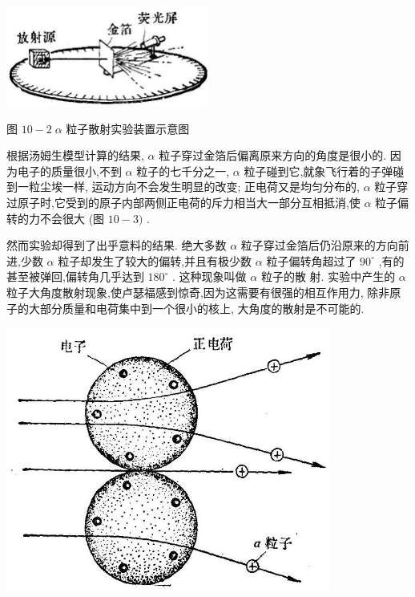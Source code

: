 \documentclass[10pt]{article}
\begin{document}
\begin{center}
\includegraphics[max width=0.5\textwidth]{images/01913056-1f15-74d8-9184-9aab52c9d66b_328_650051.jpg}
\end{center}

图 \({10} - 2\;\alpha\) 粒子散射实验装置示意图

根据汤姆生模型计算的结果, \(\alpha\) 粒子穿过金箔后偏离原来方向的角度是很小的. 因为电子的质量很小,不到 \(\alpha\) 粒子的七千分之一, \(\alpha\) 粒子碰到它,就象飞行着的子弹碰到一粒尘埃一样, 运动方向不会发生明显的改变; 正电荷又是均匀分布的, \(\alpha\) 粒子穿过原子时,它受到的原子内部两侧正电荷的斥力相当大一部分互相抵消,使 \(\alpha\) 粒子偏转的力不会很大 (图 \({10} - 3)\) .

然而实验却得到了出乎意料的结果. 绝大多数 \(\alpha\) 粒子穿过金箔后仍沿原来的方向前进,少数 \(\alpha\) 粒子却发生了较大的偏转,并且有极少数 \(\alpha\) 粒子偏转角超过了 \({90}^{ \circ }\) ,有的甚至被弹回,偏转角几乎达到 \({180}^{ \circ }\) . 这种现象叫做 \(\alpha\) 粒子的散 射. 实验中产生的 \(\alpha\) 粒子大角度散射现象,使卢瑟福感到惊奇,因为这需要有很强的相互作用力, 除非原子的大部分质量和电荷集中到一个很小的核上, 大角度的散射是不可能的.

\begin{center}
\includegraphics[max width=0.8\textwidth]{images/01913056-1f15-74d8-9184-9aab52c9d66b_329_296951.jpg}
\end{center}
\end{document}
